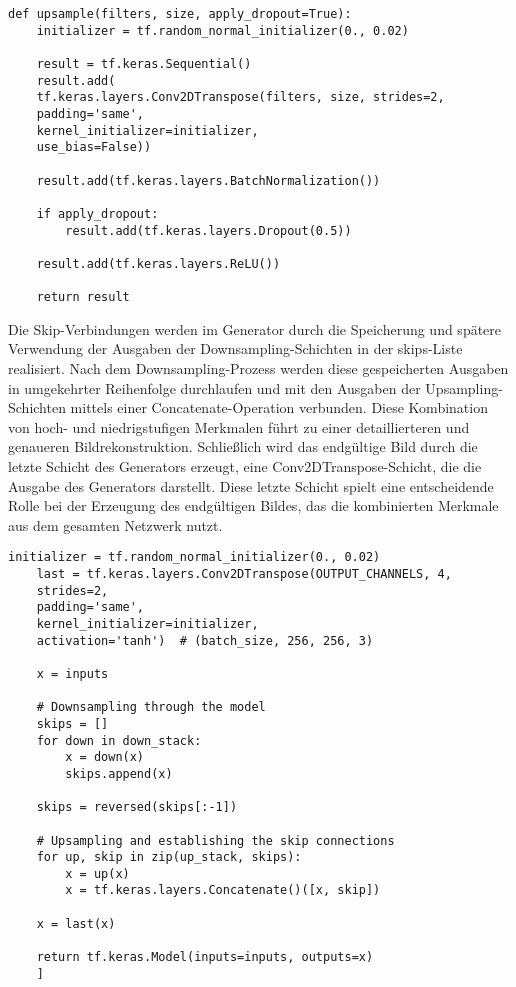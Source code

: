 \begin{lstlisting}[language=pyhaff, caption={Upsampling-Schritt}, label={cod:Pix2PixGAN Generator}]
	def upsample(filters, size, apply_dropout=True):
	initializer = tf.random_normal_initializer(0., 0.02)
	
	result = tf.keras.Sequential()
	result.add(
	tf.keras.layers.Conv2DTranspose(filters, size, strides=2,
	padding='same',
	kernel_initializer=initializer,
	use_bias=False))
	
	result.add(tf.keras.layers.BatchNormalization())
	
	if apply_dropout:
		result.add(tf.keras.layers.Dropout(0.5))
	
	result.add(tf.keras.layers.ReLU())
	
	return result
\end{lstlisting} 
Die Skip-Verbindungen werden im Generator durch die Speicherung und spätere Verwendung der Ausgaben der Downsampling-Schichten in der skips-Liste realisiert. Nach dem Downsampling-Prozess werden diese gespeicherten Ausgaben in umgekehrter Reihenfolge durchlaufen und mit den Ausgaben der Upsampling-Schichten mittels einer Concatenate-Operation verbunden. Diese Kombination von hoch- und niedrigstufigen Merkmalen führt zu einer detaillierteren und genaueren Bildrekonstruktion.
\newline
Schließlich wird das endgültige Bild durch die letzte Schicht des Generators erzeugt, eine Conv2DTranspose-Schicht, die die Ausgabe des Generators darstellt. Diese letzte Schicht spielt eine entscheidende Rolle bei der Erzeugung des endgültigen Bildes, das die kombinierten Merkmale aus dem gesamten Netzwerk nutzt.

\begin{lstlisting}[language=pyhaff, caption={Skip Verbindungen}, label={cod:Pix2PixGAN Generator}]
	initializer = tf.random_normal_initializer(0., 0.02)
	last = tf.keras.layers.Conv2DTranspose(OUTPUT_CHANNELS, 4,
	strides=2,
	padding='same',
	kernel_initializer=initializer,
	activation='tanh')  # (batch_size, 256, 256, 3)
	
	x = inputs
	
	# Downsampling through the model
	skips = []
	for down in down_stack:
		x = down(x)
		skips.append(x)
	
	skips = reversed(skips[:-1])
	
	# Upsampling and establishing the skip connections
	for up, skip in zip(up_stack, skips):
		x = up(x)
		x = tf.keras.layers.Concatenate()([x, skip])
	
	x = last(x)
	
	return tf.keras.Model(inputs=inputs, outputs=x)
	]
\end{lstlisting} 